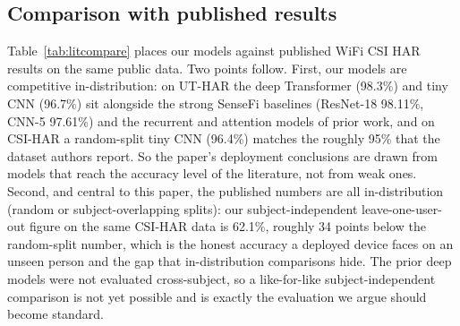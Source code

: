 \documentclass{ieeeaccess}
\begin{document}
\subsection{Comparison with published results}
\label{sec:results-compare}
Table~\ref{tab:litcompare} places our models against published WiFi CSI HAR results on the same public data. Two points follow. First, our models are competitive in-distribution: on UT-HAR the deep Transformer (98.3\%) and tiny CNN (96.7\%) sit alongside the strong SenseFi baselines (ResNet-18 98.11\%, CNN-5 97.61\%) and the recurrent and attention models of prior work, and on CSI-HAR a random-split tiny CNN (96.4\%) matches the roughly 95\% that the dataset authors report. So the paper's deployment conclusions are drawn from models that reach the accuracy level of the literature, not from weak ones. Second, and central to this paper, the published numbers are all in-distribution (random or subject-overlapping splits): our subject-independent leave-one-user-out figure on the same CSI-HAR data is 62.1\%, roughly 34 points below the random-split number, which is the honest accuracy a deployed device faces on an unseen person and the gap that in-distribution comparisons hide. The prior deep models were not evaluated cross-subject, so a like-for-like subject-independent comparison is not yet possible and is exactly the evaluation we argue should become standard.
\end{document}
